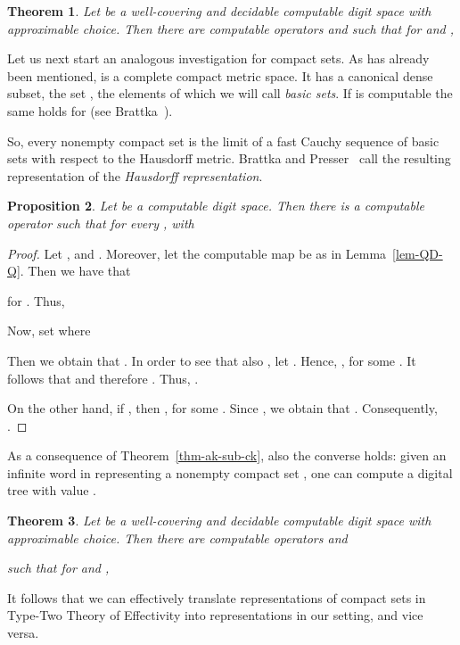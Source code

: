 \documentclass[microtype]{jloganal}
\theoremstyle{plain}
\newtheorem{theorem}{Theorem}[section]
\newtheorem{proposition}[theorem]{Proposition}
\theoremstyle{definition}
\begin{document}
\begin{theorem}
\label{thm-stream=cauchy}
Let  be a well-covering and decidable computable digit space with 
approximable choice. Then there are computable operators 
 and  
such that for  and , 

\end{theorem}

Let us next start an analogous investigation for compact sets. As has already been mentioned,  is a complete compact metric space. It has a canonical dense subset, the set , the elements of which we will call \emph{basic sets}. 
If  is computable the same holds for  (see Brattka~\cite{Brattka99}). 

So, every nonempty compact set is the limit of a fast Cauchy sequence of basic sets with respect to the Hausdorff metric. Brattka and Presser~\cite{BrattkaPresser03} call the resulting representation  of  the \emph{Hausdorff representation}.

\begin{proposition}\label{prop-treetohausdorff}
Let  be a computable digit space. Then there is a 
computable operator 
 such that for every 
,  with 

\end{proposition}
\begin{proof}
Let ,  and . Moreover, let the computable map  be as in Lemma~\ref{lem-QD-Q}. Then we have that 

for . Thus,

Now, set  where

Then we obtain that . In order to see that also , let . Hence, , for some . It follows that  and therefore . Thus, . 

On the other hand, if , then , for some . Since , we obtain that . Consequently, .
\end{proof}

As a consequence of Theorem~\ref{thm-ak-sub-ck}, also the converse holds: given an infinite word in  representing a nonempty compact set , one can compute a digital tree with value .

\begin{theorem}\label{thm-hausdorfftotree}
Let  be a well-covering and decidable computable digit space 
with approximable choice. Then there are computable operators 
 and 
 
such that for  and ,

\end{theorem}

It follows that we can effectively translate representations of compact 
sets in Type-Two Theory of Effectivity into representations in our setting, and vice versa.
\end{document}
